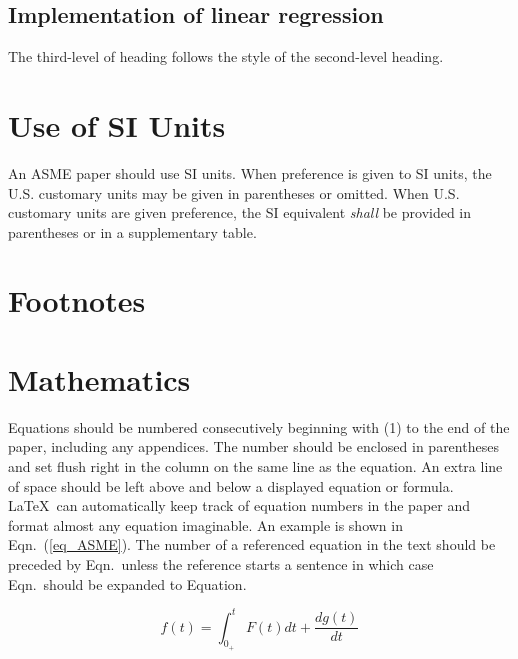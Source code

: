 \documentclass[twocolumn,10pt,cleanfoot]{asme2ej}
\begin{document}

\subsection{Implementation of linear regression}

The third-level of heading follows the style of the second-level heading.


\section{Use of SI Units}

An ASME paper should use SI units.  When preference is given to SI units, the U.S. customary units may be given in parentheses or omitted. When U.S. customary units are given preference, the SI equivalent {\em shall} be provided in parentheses or in a supplementary table. 

\section{Footnotes\protect\footnotemark}



\section{Mathematics}

Equations should be numbered consecutively beginning with (1) to the end of the paper, including any appendices.  The number should be enclosed in parentheses and set flush right in the column on the same line as the equation.  An extra line of space should be left above and below a displayed equation or formula. \LaTeX\ can automatically keep track of equation numbers in the paper and format almost any equation imaginable. An example is shown in Eqn.~(\ref{eq_ASME}). The number of a referenced equation in the text should be preceded by Eqn.\ unless the reference starts a sentence in which case Eqn.\ should be expanded to Equation.

\begin{equation}
f(t) = \int_{0_+}^t F(t) dt + \frac{d g(t)}{d t}
\label{eq_ASME}
\end{equation}
\end{document}
